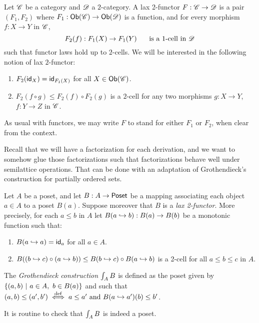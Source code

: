\begin{definition}
Let $\Cat$ be a category and $\CatTwo$ a $2$-category.
A lax 2-functor $F : \Cat \to \CatTwo$
is a pair $(F_1,F_2)$ where $F_1 : \Ob(\Cat) \to \Ob(\CatTwo)$
is a function, and for every morphism $f : X \to Y$ in $\Cat$,
\[
  F_2(f) : F_1(X) \to F_1(Y) \HS\text{ is a 1-cell in $\CatTwo$}
\]
such that functor laws hold up to $2$-cells.
We will be interested in the following notion of lax $2$-functor:
\begin{enumerate}
\item $F_2(\id_X) = \id_{F_1(X)}$ for all $X \in \Ob(\Cat)$.
\item $F_2(f \circ g) \leq F_2(f) \circ F_2(g)$ is a $2$-cell
      for any two morphisms $g : X \to Y$, $f : Y \to Z$ in $\Cat$.
\end{enumerate}
As usual with functors, we may write $F$ to stand for either $F_1$ or $F_2$,
when clear from the context.
\end{definition}

Recall that we will have a factorization for each derivation,
and we want to somehow glue those factorizations such that
factorizations behave well under semilattice operations.
That can be done with an adaptation of Grothendieck's construction
for partially ordered sets.

\begin{definition}
Let $A$ be a poset, and let $B : A \to \Poset$ be a mapping associating
each object $a \in A$ to a poset $B(a)$.
Suppose moreover that $B$ is a {\em lax 2-functor}.
More precisely,
for each $a \leq b$ in $A$ let $B(\pt{b}{a}) : B(a) \to B(b)$
be a monotonic function such that:
\begin{enumerate}
\item $B(\pt{a}{a}) = \id_a$ for all $a \in A$.
\item $B((\pt{c}{b}) \circ (\pt{b}{a})) \totwocell B(\pt{c}{b}) \circ B(\pt{b}{a})$ is a 2-cell for all $a \leq b \leq c$ in $A$.
\end{enumerate}
The {\em Grothendieck construction} $\grothy{A}{B}$
is defined as the poset
given by
$
  \set{(a,b) \ST a \in A,\ b \in B(a)}
$
and such that $(a, b) \leq (a', b') \iffdef a \leq a' \text{ and } B(\pt{a'}{a})(b) \leq b'$.
\end{definition}
It is routine to check that $\grothy{A}{B}$ is indeed a poset.


